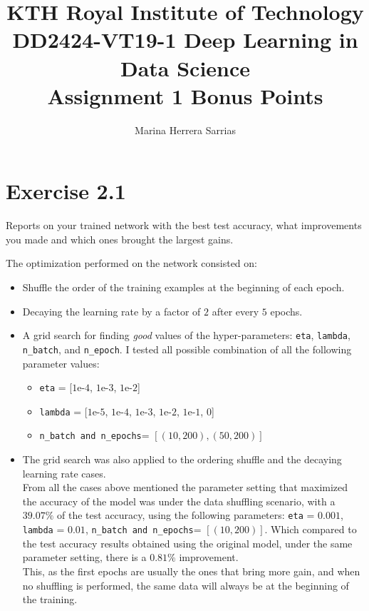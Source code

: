 \documentclass[11pt]{article}
\title{\vspace{-5.0cm}KTH Royal Institute of Technology\\ DD2424-VT19-1 Deep Learning in Data Science\\ Assignment 1 Bonus Points }
\author{Marina Herrera Sarrias }
\begin{document}
\maketitle

\section{Exercise 2.1} 
\begin{tcolorbox}
Reports on your trained network with the best test accuracy, what improvements you made and which ones brought the largest gains.
\end{tcolorbox}

The optimization performed on the network consisted on:\\
\begin{itemize} 
	\item Shuffle the order of the training examples at the beginning of each epoch.
	\item Decaying the learning rate by a factor of $2$ after every $5$ epochs. 
	\item A grid search for finding \textit{good} values of the hyper-parameters: \texttt{eta}, \texttt{lambda}, \texttt{n\_batch}, and \texttt{n\_epoch}. I tested all possible combination of all the following parameter values:
	\begin{itemize}
		\item \texttt{eta} = [$1\text{e-}4$, $1\text{e-}3$, $1\text{e-}2$]
		\item \texttt{lambda} = [$1\text{e-}5$, $1\text{e-}4$, $1\text{e-}3$, $1\text{e-}2$, $1\text{e-}1$, $0$]
		\item \texttt{n\_batch and n\_epochs}= $[(10, 200), (50, 200)]$
	\end{itemize}
	\item The grid search was also applied to the  ordering shuffle and the decaying learning rate cases. \\

From all the cases above mentioned the parameter setting that maximized the accuracy of the model was under the data shuffling scenario, with a $39.07\%$ of the test accuracy, using the following parameters:  \texttt{eta} = $0.001$, \texttt{lambda} = $0.01$, \texttt{n\_batch and n\_epochs}= $[(10, 200)]$. Which compared to the test accuracy results obtained using the original model, under the same parameter setting, there is a $0.81\%$ improvement.\\

This, as the first epochs are usually the ones that bring more gain, and when no shuffling is performed, the same data will always be at the beginning of the training.\\


\end{itemize}
\end{document}
